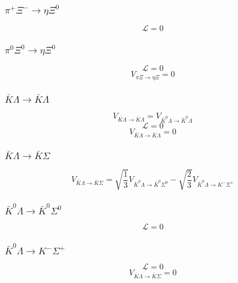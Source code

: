 \subsubsection{$\pi^{+}\Xi^{-}\rightarrow\eta\Xi^{0}$}
\begin{equation}
	\mathcal{L}=0
\end{equation}
\subsubsection{$\pi^{0}\Xi^{0}\rightarrow\eta\Xi^{0}$}
\begin{equation}
	\mathcal{L}=0
\end{equation}
\begin{equation}
	V_{\pi\Xi\to\eta\Xi}=0
\end{equation}
\subsubsection{$\bar{K}\Lambda\rightarrow \bar{K}\Lambda$}
\begin{equation}
	V_{\bar{K}\Lambda\rightarrow \bar{K}\Lambda}=V_{\bar{K}^{0}\Lambda\rightarrow \bar{K}^{0}\Lambda}
\end{equation}
\begin{equation}
	\mathcal{L}=0
\end{equation}
\begin{equation}
	V_{\bar{K}\Lambda\to \bar{K}\Lambda}=0
\end{equation}
\subsubsection{$\bar{K}\Lambda\rightarrow \bar{K}\Sigma$}
\begin{equation}
	V_{\bar{K}\Lambda\rightarrow \bar{K}\Sigma}=\sqrt{\frac{1}{3}}V_{\bar{K}^{0}\Lambda\rightarrow \bar{K}^{0}\Sigma^{0}}-\sqrt{\frac{2}{3}}V_{\bar{K}^{0}\Lambda\rightarrow K^{-}\Sigma^{+}}
\end{equation}
\subsubsection{$\bar{K}^{0}\Lambda\rightarrow \bar{K}^{0}\Sigma^{0}$}
\begin{equation}
	\mathcal{L}=0
\end{equation}
\subsubsection{$\bar{K}^{0}\Lambda\rightarrow K^{-}\Sigma^{+}$}
\begin{equation}
	\mathcal{L}=0
\end{equation}
\begin{equation}
	V_{\bar{K}\Lambda\to \bar{K}\Sigma}=0
\end{equation}
